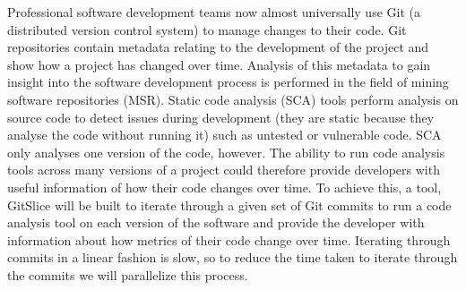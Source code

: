 Professional software development teams now almost universally use Git (a distributed version control system) to manage changes to their code.
Git repositories contain metadata relating to the development of the project and show how a project has changed over time.
Analysis of this metadata to gain insight into the software development process is performed in the field of mining software repositories (MSR).
Static code analysis (SCA) tools perform analysis on source code to detect issues during development (they are static because they analyse the code without running it) such as untested or vulnerable code.
SCA only analyses one version of the code, however.
The ability to run code analysis tools across many versions of a project could therefore provide developers with useful information of how their code changes over time.
To achieve this, a tool, GitSlice will be built to iterate through a given set of Git commits to run a code analysis tool on each version of the software and provide the developer with information about how metrics of their code change over time.
Iterating through commits in a linear fashion is slow, so to reduce the time taken to iterate through the commits we will parallelize this process.
